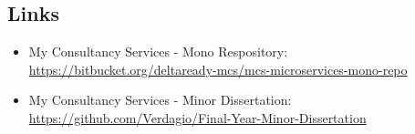 \subsection*{Links}

\begin{itemize}
\item{My Consultancy Services - Mono Respository: \\ \url{https://bitbucket.org/deltaready-mcs/mcs-microservices-mono-repo}}

\item{My Consultancy Services - Minor Dissertation: \\
\url{https://github.com/Verdagio/Final-Year-Minor-Dissertation}}

\end{itemize}
